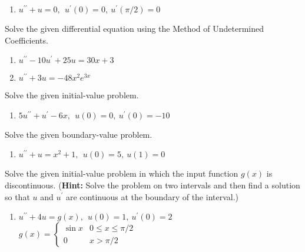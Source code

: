 \begin{fullwidth}
\begin{enumerate}[resume]
\vspace{1.0cm}

\item $u^{\prime \prime}+u =0, \ \ u^{\prime}(0)=0, \ u^{\prime}(\pi/2)=0$

\vspace{1.0cm}

\end{enumerate}

\noindent Solve the given differential equation using the Method of Undetermined Coefficients.

\begin{enumerate}[resume]
\item $u^{\prime \prime}-10u^{\prime}+25u=30x+3$

\vspace{1.0cm}

\item $u^{\prime \prime}+3u=-48x^2e^{3x}$

\vspace{1.0cm}
\end{enumerate}

\noindent Solve the given initial-value problem.

\begin{enumerate}[resume]
\item $5u^{\prime \prime} + u^{\prime} - 6x, \ \ u(0)=0, \ u^{\prime}(0)=-10$

\vspace{1.0cm}

\end{enumerate}

\noindent Solve the given boundary-value problem.

\begin{enumerate}[resume]
\item $u^{\prime \prime}+u=x^2+1, \ \ u(0)=5, \ u(1)=0$

\vspace{1.0cm}

\end{enumerate}

\noindent Solve the given initial-value problem in which the input function $g(x)$ is discontinuous. (\textbf{Hint:} Solve the problem on two intervals and then find a solution so that $u$ and $u^{\prime}$ are continuous at the boundary of the interval.)

\begin{enumerate}[resume]
\item $u^{\prime \prime}+4u=g(x), \ \ u(0)=1, \ u^{\prime}(0)=2$
\begin{equation*}
g(x) = 
\begin{cases}
\sin{x} & 0 \le x \le \pi/2 \\
0 & x > \pi/2
\end{cases}
\hspace{12cm}
\end{equation*}

\end{enumerate}


\end{fullwidth}
